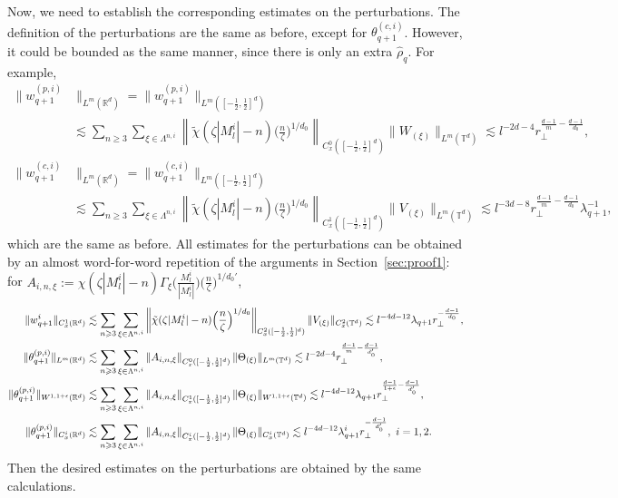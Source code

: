 \documentclass[10pt,a4paper]{amsart}
\numberwithin{equation}{section}
\def\({{\Big(}}
\def\){{\Big)}}
\newcommand{\norm}[1]{\left\|#1\right\|}
\def\geq{\geqslant}
\def\({{\Big(}}
\def\){{\Big)}}
\def\geq{\geqslant}
\begin{document}
Now, we need to  establish the corresponding estimates on the perturbations.  
  The definition of the perturbations are the same as before, except for $\theta_{q+1}^{(c,i)}$. However, it could be bounded as the same manner, since there is only an extra $\hat{\rho}_q$.  For example, 
\begin{align*}\|w_{q+1}^{(p,i)}&\|_{L^m(\mathbb{R}^d)}=\|w_{q+1}^{(p,i)}\|_{L^m([-\frac12,\frac12]^d)}\\
&\lesssim\sum_{n\geq3}\sum_{\xi\in\Lambda^{n,i}}\norm{\tilde{\chi}  (\zeta |M^i_l|-n) \(\frac{n}{\zeta }\)^{1/d_0}}_ {C_{x}^0([-\frac12,\frac12]^d)}\|W_{ (\xi)}\|_{L^m(\mathbb{T}^d)}\lesssim l^{-2d-4}r_\perp^{\frac{d-1}{m}-\frac{d-1}{d_0}},\\
\|w_{q+1}^{(c,i)}&\|_{L^m(\mathbb{R}^d)}=\|w_{q+1}^{(c,i)}\|_{L^m([-\frac12,\frac12]^d)}\\
&\lesssim\sum_{n\geq3}\sum_{\xi\in\Lambda^{n,i}}\norm{\tilde{\chi}(\zeta |M^i_l|-n)  \(\frac{n}{\zeta }\)^{1/d_0}}_{C^1_{x}([-\frac12,\frac12]^d)}\|V_{ (\xi)}\|_{L^m(\mathbb{T}^d)}\lesssim l^{-3d-8}r_\perp^{\frac{d-1}{m}-\frac{d-1}{d_0}}\lambda_{q+1}^{-1},
\end{align*}
which are the same as before. All estimates for the perturbations can be obtained by an almost word-for-word repetition of the arguments in Section~\ref{sec:proof1}: for $A_{i,n,\xi}:=\chi(\zeta |M^i_l|-n)\Gamma_{\xi}\(\frac{M^i_l}{|M^i_l|}\)\(\frac{n}{\zeta }\)^{1/d_0'}$,
\begin{align}
\|w_{q+1}^i\|_{C_{x}^1(\mathbb{R}^d)}&\lesssim  \sum_{n\geq3}\sum_{\xi\in\Lambda^{n,i}}\norm{\tilde{\chi}(\zeta |M^i_l|-n) \(\frac{n}{\zeta }\)^{1/d_0}}_{C_{x}^{2}([-\frac12,\frac12]^d)}\|  V_{ (\xi)}\|_{C_{x}^2(\mathbb{T}^d)} \lesssim  l^{-4d-12}\lambda_{q+1} r_\perp^{-\frac{d-1}{d_0}},\notag\\
\|\theta_{q+1}^{(p,i)} \|_{L^{m}(\mathbb{R}^d)}&\lesssim\sum_{n\geq3}\sum_{\xi\in\Lambda^{n,i}}\norm{A_{i,n,\xi}}_{C_{x}^0([-\frac12,\frac12]^d)}\|\Theta_{ (\xi)} \|_{L^{m}(\mathbb{T}^d)} \lesssim l^{-2d-4}r_\perp^{\frac{d-1}{m}-\frac{d-1}{d_0'}} ,\notag\\
\|\theta_{q+1}^{(p,i)}\|_{W^{1,1+\epsilon}(\mathbb{R}^d)}&\lesssim\sum_{n\geq3}\sum_{\xi\in\Lambda^{n,i}}\norm{A_{i,n,\xi}}_ {C_{x}^1([-\frac12,\frac12]^d)}\|\Theta_{ (\xi)} \|_{W^{1,1+\epsilon}(\mathbb{T}^d)} \lesssim l^{-4d-12}\lambda_{q+1}r_\perp^{\frac{d-1}{1+\epsilon}-\frac{d-1}{d_0'}}
 ,\notag\\
\|\theta_{q+1}^{(p,i)} \|_ {C_{x}^i(\mathbb{R}^d)} 
&\lesssim\sum_{n\geq3}\sum_{\xi\in\Lambda^{n,i}}\norm{A_{i,n,\xi}}_ {C_{x}^i([-\frac12,\frac12]^d)}\|\Theta_{ (\xi)} \|_ {C_{x}^i(\mathbb{T}^d)} \lesssim l^{-4d-12}\lambda_{q+1}^i r_\perp^{-\frac{d-1}{d_0'}},\ i=1,2.\notag
\end{align}
 Then the desired estimates on the perturbations are obtained by the same calculations.
  
\end{document}

